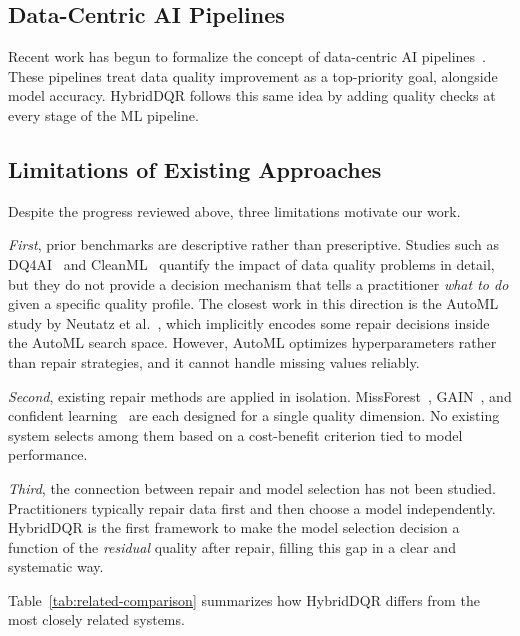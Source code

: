 \documentclass[runningheads]{llncs}
\begin{document}
\subsection{Data-Centric AI Pipelines}

Recent work has begun to formalize the concept of data-centric AI
pipelines~\cite{zha2023datacentric,whang2023data}.
These pipelines treat data quality improvement as a top-priority
goal, alongside model accuracy.
HybridDQR follows this same idea by adding quality checks
at every stage of the ML pipeline.

\subsection{Limitations of Existing Approaches}

Despite the progress reviewed above, three limitations motivate
our work.

\textit{First}, prior benchmarks are descriptive rather than
prescriptive.
Studies such as DQ4AI~\cite{mohammed2025} and CleanML~\cite{li2021cleanml}
quantify the impact of data quality problems in detail, but they
do not provide a decision mechanism that tells a practitioner
\emph{what to do} given a specific quality profile.
The closest work in this direction is the AutoML study by
Neutatz et al.~\cite{neutatz2022}, which implicitly encodes some
repair decisions inside the AutoML search space.
However, AutoML optimizes hyperparameters rather than repair
strategies, and it cannot handle missing values reliably.

\textit{Second}, existing repair methods are applied in isolation.
MissForest~\cite{stekhoven2012},
GAIN~\cite{yoon2018gain},
and confident learning~\cite{northcutt2021} are each designed
for a single quality dimension.
No existing system selects among them based on a cost-benefit
criterion tied to model performance.

\textit{Third}, the connection between repair and model selection
has not been studied.
Practitioners typically repair data first and then choose a model
independently.
HybridDQR is the first framework to make the model selection
decision a function of the \emph{residual} quality after repair,
filling this gap in a clear and systematic way.

Table~\ref{tab:related-comparison} summarizes how HybridDQR
differs from the most closely related systems.
\end{document}
